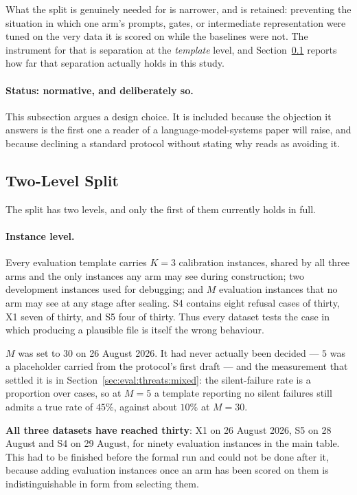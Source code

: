 What the split is genuinely needed for is narrower, and is retained: preventing the situation
in which one arm's prompts, gates, or intermediate representation were tuned on the very data
it is scored on while the baselines were not. The instrument for that is separation at the
\emph{template} level, and Section~\ref{sec:eval:split} reports how far that separation
actually holds in this study.

\paragraph{Status: normative, and deliberately so.} This subsection argues a design choice.
It is included because the objection it answers is the first one a reader of a
language-model-systems paper will raise, and because declining a standard protocol without
stating why reads as avoiding it.

\subsection{Two-Level Split}
\label{sec:eval:split}

The split has two levels, and only the first of them currently holds in full.

\paragraph{Instance level.}
Every evaluation template carries $K=3$ calibration instances, shared by all three arms and
the only instances any arm may see during construction; two development instances used for
debugging; and $M$ evaluation instances that no arm may see at any stage after sealing. S4
contains eight refusal cases of thirty, X1 seven of thirty, and S5 four of thirty. Thus every dataset
tests the case in which producing a plausible file is itself the wrong behaviour.

$M$ was set to $30$ on 26 August 2026. It had never actually been decided --- $5$ was a
placeholder carried from the protocol's first draft --- and the measurement that settled it
is in Section~\ref{sec:eval:threats:mixed}: the silent-failure rate is a proportion over
cases, so at $M=5$ a template reporting no silent failures still admits a true rate of $45\%$,
against about $10\%$ at $M=30$.

\textbf{All three datasets have reached thirty}: X1 on 26 August 2026, S5 on 28 August and
S4 on 29 August, for ninety evaluation instances in the main table. This had to be finished
before the formal run and could not be done after it, because adding evaluation instances
once an arm has been scored on them is indistinguishable in form from selecting them.

